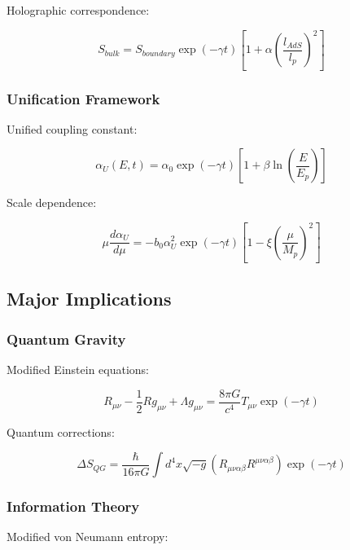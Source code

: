 \documentclass[12pt]{article}
\theoremstyle{plain}
\theoremstyle{definition}
\theoremstyle{remark}
\begin{document}
Holographic correspondence:

\begin{equation}
S_{bulk} = S_{boundary}\exp(-\gamma t)\left[1 + \alpha\left(\frac{l_{AdS}}{l_p}\right)^2\right]
\end{equation}

\subsubsection{Unification Framework}

Unified coupling constant:

\begin{equation}
\alpha_U(E,t) = \alpha_0\exp(-\gamma t)\left[1 + \beta\ln\left(\frac{E}{E_p}\right)\right]
\end{equation}

Scale dependence:

\begin{equation}
\mu\frac{d\alpha_U}{d\mu} = -b_0\alpha_U^2\exp(-\gamma t)\left[1 - \xi\left(\frac{\mu}{M_p}\right)^2\right]
\end{equation}

\subsection{Major Implications}

\subsubsection{Quantum Gravity}

Modified Einstein equations:

\begin{equation}
R_{\mu\nu} - \frac{1}{2}Rg_{\mu\nu} + \Lambda g_{\mu\nu} = \frac{8\pi G}{c^4}T_{\mu\nu}\exp(-\gamma t)
\end{equation}

Quantum corrections:

\begin{equation}
\Delta S_{QG} = \frac{\hbar}{16\pi G}\int d^4x\sqrt{-g}(R_{\mu\nu\alpha\beta}R^{\mu\nu\alpha\beta})\exp(-\gamma t)
\end{equation}

\subsubsection{Information Theory}

Modified von Neumann entropy:
\end{document}
